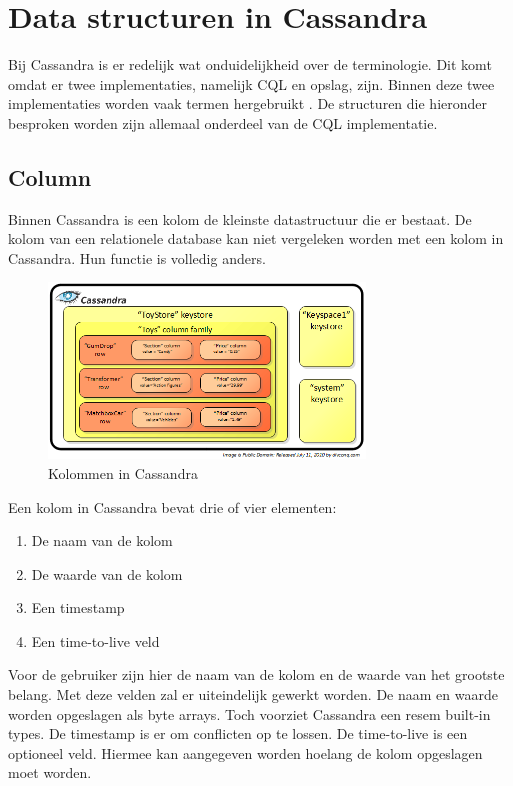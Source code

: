 \chapter{Data structuren in Cassandra}
\label{ch:cassandra_data}

Bij Cassandra is er redelijk wat onduidelijkheid over de terminologie.
Dit komt omdat er twee implementaties, namelijk CQL en opslag, zijn.
Binnen deze twee implementaties worden vaak termen hergebruikt \citep{Ahmed2015Terminology}.
De structuren die hieronder besproken worden zijn allemaal onderdeel van de CQL implementatie.

\section{Column}
Binnen Cassandra is een kolom de kleinste datastructuur die er bestaat.
De kolom van een relationele database kan niet vergeleken worden met een kolom in Cassandra.
Hun functie is volledig anders.

\begin{figure}[H]
	\centering
	\includegraphics[width=0.75\textwidth]{img/4_data/column}
	\caption{Kolommen in Cassandra \citep{Lampe2010Column}}
	\label{fig:column}
\end{figure}

Een kolom in Cassandra bevat drie of vier elementen:
\begin{enumerate}
	\item De naam van de kolom
	\item De waarde van de kolom
	\item Een timestamp
	\item Een time-to-live veld
\end{enumerate}

Voor de gebruiker zijn hier de naam van de kolom en de waarde van het grootste belang.
Met deze velden zal er uiteindelijk gewerkt worden.
De naam en waarde worden opgeslagen als byte arrays.
Toch voorziet Cassandra een resem built-in types.
De timestamp is er om conflicten op te lossen.
De time-to-live is een optioneel veld.
Hiermee kan aangegeven worden hoelang de kolom opgeslagen moet worden.

